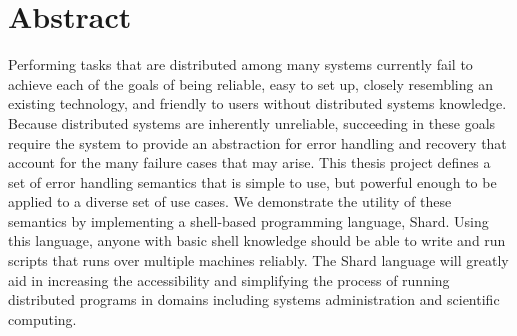 \documentclass[oneside]{report}
\begin{document}



\tableofcontents
\listoffigures
\listoftables
\onehalfspacing

\chapter*{Abstract}

Performing tasks that are distributed among many systems currently fail to achieve each of the goals of being reliable, easy to set up, closely resembling an existing technology, and friendly to users without distributed systems knowledge.
Because distributed systems are inherently unreliable, succeeding in these goals require the system to provide an abstraction for error handling and recovery that account for the many failure cases that may arise.
This thesis project defines a set of error handling semantics that is simple to use, but powerful enough to be applied to a diverse set of use cases.
We demonstrate the utility of these semantics by implementing a shell-based programming language, Shard.
Using this language, anyone with basic shell knowledge should be able to write and run scripts that runs over multiple machines reliably.
The Shard language will greatly aid in increasing the accessibility and simplifying the process of running distributed programs in domains including systems administration and scientific computing.
\end{document}

